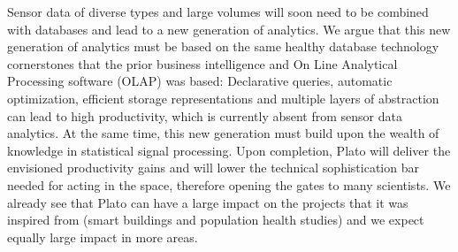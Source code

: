 \documentclass{article}
\renewcommand{\paragraph}[1]{{\noindent {\bf #1}}}
\begin{document}
\paragraph{Broad Impact} Sensor data of diverse types and large volumes will soon need to be combined with databases and lead to a new generation of analytics. We argue that this new generation of analytics must be based on the same healthy database technology cornerstones that the prior business intelligence and On Line Analytical Processing software (OLAP) was based: Declarative queries, automatic optimization, efficient storage representations and multiple layers of abstraction can lead to high productivity, which is currently absent from sensor data analytics. At the same time, this new generation must build upon the wealth of knowledge in statistical signal processing. Upon completion, Plato will deliver the envisioned productivity gains and will lower the technical sophistication bar needed for acting in the space, therefore opening the gates to many scientists. We already see that Plato can have a large impact on the projects that it was inspired from (smart buildings and population health studies) and we expect equally large impact in more areas.
\end{document}

